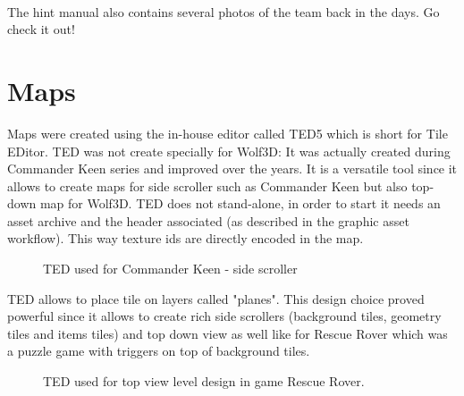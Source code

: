 \documentclass[book.tex]{subfiles}
\begin{document}
       \begin{minipage}{.48\textwidth}
  \end{minipage}
      \begin{minipage}{.48\textwidth}
  \end{minipage}\\

\par 
The hint manual also contains several photos of the team back in the days. Go check it out!













\section{Maps}
Maps were created using the in-house editor called TED5 which is short for Tile EDitor. TED was not create specially for Wolf3D: It was actually created during Commander Keen series and improved over the years. It is a versatile tool since it allows to create maps for side scroller such as Commander Keen but also top-down map for Wolf3D. TED does not stand-alone, in order to start it needs an asset archive and the header associated (as described in the graphic asset workflow). This way texture ids are directly encoded in the map.\\

 \begin{figure}[H]
\centering
 \end{figure}

  \begin{figure}[H]
\centering
 \end{figure}


 \begin{figure}[H]
\centering
 \caption{TED used for Commander Keen - side scroller} 
 \end{figure}

TED allows to place tile on layers called "planes". This design choice proved powerful since it allows to create rich side scrollers (background tiles, geometry tiles and items tiles) and top down view as well like for Rescue Rover which was a puzzle game with triggers on top of background tiles.\\
\begin{figure}[H]
\centering
 \caption{TED used for top view level design in game Rescue Rover.} 
 \end{figure}
\end{document}
